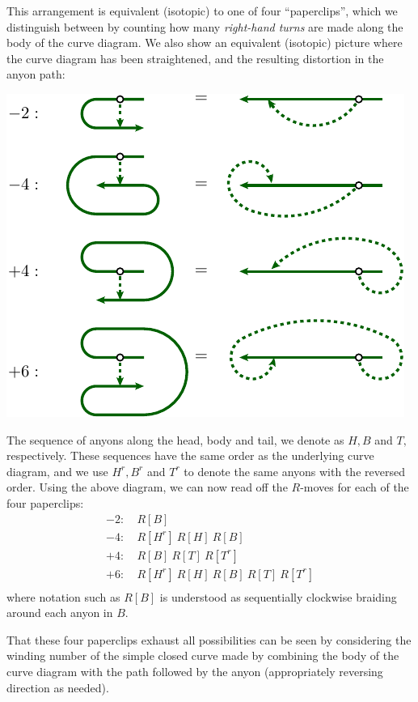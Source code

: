 This arrangement is equivalent (isotopic) to one of four 
``paperclips'', which we distinguish between by counting how
many \emph{right-hand turns} are made along the body of the curve diagram.
We also show an equivalent (isotopic) picture where the
curve diagram has been straightened, and the resulting distortion
in the anyon path:
\begin{center}
\includegraphics[]{pic-paperclip.pdf}
\end{center}
The sequence of anyons along the head, body and tail, we denote as $H, B$ and $T,$
respectively.
These sequences have the same order as the underlying curve diagram, and 
we use
$H^r, B^r$ and $T^r$ to denote the same anyons with the reversed order.
Using the above diagram, we can now read off the $R$-moves for each
of the four paperclips:
\begin{align*}
-2:&\ R[B] \\
-4:&\ R[H^r]\ R[H]\ R[B] \\
+4:&\ R[B]\ R[T]\ R[T^r] \\
+6:&\ R[H^r]\ R[H]\ R[B]\ R[T]\ R[T^r] \\
\end{align*}
where notation such as $R[B]$ is understood as sequentially clockwise braiding around
each anyon in $B$.

That these four paperclips exhaust all possibilities can be seen by
considering the winding number of the simple closed curve made
by combining the body of the curve diagram with the path followed by
the anyon (appropriately reversing direction as needed).


